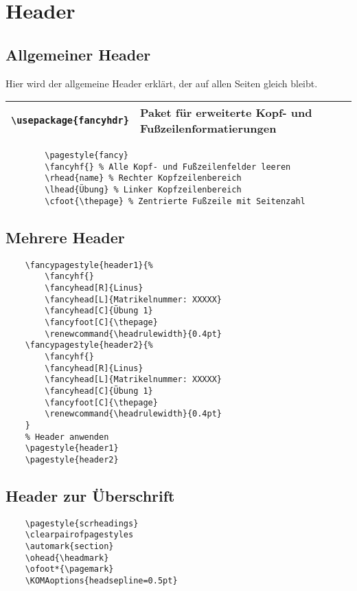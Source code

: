 \section{Header}

    \subsection{Allgemeiner Header}
    Hier wird der allgemeine Header erklärt, der auf allen Seiten gleich bleibt.

    \begin{tabular}{|p{}|p{}|}
        \hline
        \texttt{\textbackslash usepackage\{fancyhdr\}} & Paket für erweiterte Kopf- und Fußzeilenformatierungen \\
        \hline
    \end{tabular}

    \vspace{0.5cm}

    \begin{verbatim}
        \pagestyle{fancy}
        \fancyhf{} % Alle Kopf- und Fußzeilenfelder leeren
        \rhead{name} % Rechter Kopfzeilenbereich
        \lhead{Übung} % Linker Kopfzeilenbereich
        \cfoot{\thepage} % Zentrierte Fußzeile mit Seitenzahl    
    \end{verbatim}

    \subsection{Mehrere Header}

    \begin{verbatim}
    \fancypagestyle{header1}{%
        \fancyhf{}
        \fancyhead[R]{Linus}
        \fancyhead[L]{Matrikelnummer: XXXXX}
        \fancyhead[C]{Übung 1}
        \fancyfoot[C]{\thepage}
        \renewcommand{\headrulewidth}{0.4pt}
    \fancypagestyle{header2}{%
        \fancyhf{}
        \fancyhead[R]{Linus}
        \fancyhead[L]{Matrikelnummer: XXXXX}
        \fancyhead[C]{Übung 1}
        \fancyfoot[C]{\thepage}
        \renewcommand{\headrulewidth}{0.4pt}
    }
    % Header anwenden
    \pagestyle{header1}
    \pagestyle{header2}
    \end{verbatim}

    \subsection{Header zur Überschrift}

    \begin{verbatim}
    \pagestyle{scrheadings}
    \clearpairofpagestyles
    \automark{section}
    \ohead{\headmark} 
    \ofoot*{\pagemark}
    \KOMAoptions{headsepline=0.5pt} 
    \end{verbatim}

